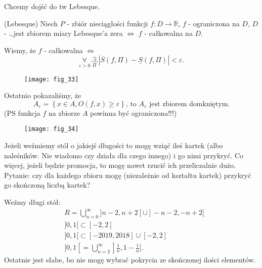\documentclass[../main.tex]{subfiles}
\begin{document}
    Chcemy dojść do tw Lebesque.
    \begin{tw}
        (Lebesque) Niech $P$ - zbiór nieciągłości funkcji $f: D\to\mathbb{R}$, $f$ - ograniczona na $D$, $D$ - \ldots jest zbiorem miary Lebesque'a zera  $\iff$ $f$ - całkowalna na $D$.
    \end{tw}

    Wiemy, że $f$ - całkowalna $\iff$
    \[
        \underset{\varepsilon>0}{\forall} .\underset{\Pi}{\exists}. |\overline{S}(f,\Pi) - \underline{S}(f,\Pi) | < \varepsilon
    .\]
    \begin{figure}[h]
        \centering
        \texttt{[image: fig\_33]}
    \end{figure}

    Ostatnio pokazaliśmy, że
    \[
        A_{\varepsilon} = \left\{ x\in A, O(f,x) \ge \varepsilon \right\} \text{, to $A_\varepsilon$ jest zbiorem domkniętym}
    .\]
    (PS funkcja $f$ na zbiorze $A$ powinna być ograniczona!!!)
    \begin{figure}[h]
        \centering
        \texttt{[image: fig\_34]}
    \end{figure}

    \begin{obserwacja}
        Jeżeli weźmiemy stól o jakiejś długości to mogę wziąć ileś kartek (albo naleśników. Nie wiadomo czy działa dla czego innego) i go nimi przykryć. Co więcej, jeżeli będzie promocja, to mogę nawet rzucić ich przeliczalnie dużo. Pytanie: czy dla każdego zbioru mogę (niezależnie od kształtu kartek) przykryć go skończoną liczbą kartek?
    \end{obserwacja}

    Weźmy długi stół:
    \begin{align*}
        &R = \bigcup_{n=0}^\infty ] n-2, n+2 [ \cup ]-n-2, -n+2[\\
        &]0,1[ \subset [-2,2]\\
        &]0,1[ \subset [-2019,2018]\cup[-2,2]\\
        &]0,1[ = \bigcup_{n=2}^\infty ]\frac{1}{n},1-\frac{1}{n}[
    .\end{align*}
    Ostatnie jest słabe, bo nie mogę wybrać pokrycia ze skończonej ilości elementów.
\end{document}

